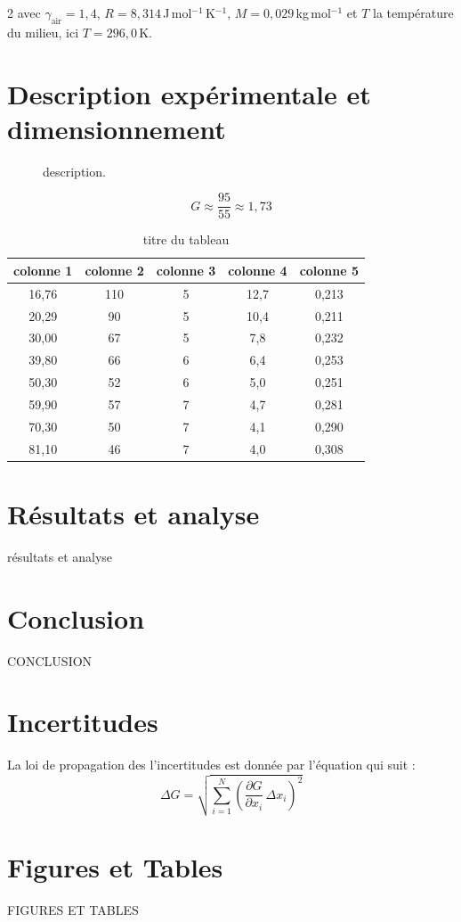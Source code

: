 \documentclass[a4paper,10pt]{article}
\begin{document}
\begin{multicols*}{2}
avec $\gamma_{\mathrm{air}} = 1{,}4$, $R = 8{,}314$\,J\,mol$^{-1}$\,K$^{-1}$, $M = 0{,}029$\,kg\,mol$^{-1}$ et $T$ la température du milieu, ici $T = 296{,}0$\,K.


\section{Description expérimentale et dimensionnement}
\begin{figure}[H]
\centering
\caption{description.}
\label{fig:image}
\end{figure}
\begin{equation}
    G \approx \frac{95}{55} \approx 1{,}73
\end{equation}

\begin{table}[H]
\centering
\caption{titre du tableau}
\label{tab:cuve}
\begin{tabular}{ccccc}
\toprule
colonne 1 & colonne 2 & colonne 3 & colonne 4 & colonne 5 \\
\midrule
16{,}76 & 110 & 5 & 12{,}7 & 0{,}213 \\
20{,}29 &  90 & 5 & 10{,}4 & 0{,}211 \\
30{,}00 &  67 & 5 & 7{,}8 & 0{,}232 \\
39{,}80 &  66 & 6 & 6{,}4 & 0{,}253 \\
50{,}30 &  52 & 6 &  5{,}0 & 0{,}251 \\
59{,}90 &  57 & 7 &  4{,}7 & 0{,}281 \\
70{,}30 &  50 & 7 &  4{,}1 & 0{,}290 \\
81{,}10 &  46 & 7 &  4{,}0 & 0{,}308 \\
\bottomrule
\end{tabular}
\end{table}

\section{Résultats et analyse}
résultats et analyse

\section{Conclusion}
CONCLUSION
\end{multicols*}


\appendix
\section{Incertitudes}
La loi de propagation des l’incertitudes est donnée par l’équation qui suit :
\begin{equation}
\Delta G = \sqrt{\sum_{i=1}^{N} \left( \frac{\partial G}{\partial x_i}\,\Delta x_i \right)^2}
\end{equation}



\section{Figures et Tables}



FIGURES ET TABLES
\end{document}
